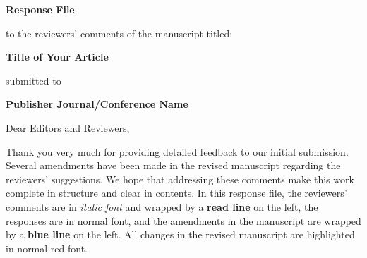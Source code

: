 
\begin{spacing}{1.5}

\begin{center}
{\LARGE
\textbf{Response File}
}

to the reviewers' comments of the manuscript titled:

{\large
\textbf{
Title of Your Article
}
}

submitted to

{\large
\textbf{
Publisher Journal/Conference Name
}
}
\end{center}
\end{spacing}
\noindent\hrulefill

\quad\newline
\noindent Dear Editors and Reviewers,

Thank you very much for providing detailed feedback to our initial submission. 
Several amendments have been made in the revised manuscript regarding the reviewers' suggestions. 
We hope that addressing these comments make this work complete in structure and clear in contents. 
In this response file, 
the reviewers' comments are in \textit{italic font} and wrapped by a \textbf{{\color{red}read line}} on the left, 
the responses are in normal font, 
and the amendments in the manuscript are wrapped by a \textbf{{\color{blue}blue line}} on the left. 
All changes in the revised manuscript are highlighted in {\color{red}normal red font}.
